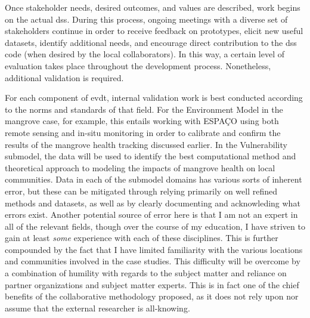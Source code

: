 \documentclass[notitlepage]{article}
\begin{document}
\color{black}


Once stakeholder needs, desired outcomes, and values are described, work begins on the actual \ac{dss}. During this process, ongoing meetings with a diverse set of stakeholders continue in order to receive feedback on prototypes, elicit new useful datasets, identify additional needs, and encourage direct contribution to the \ac{dss} code (when desired by the local collaborators). In this way, a certain level of evaluation takes place throughout the development process. Nonetheless, additional validation is required.

For each component of \ac{evdt}, internal validation work is best conducted according to the norms and standards of that field. For the Environment Model in the mangrove case, for example, this entails working with ESPAÇO using both remote sensing and in-situ monitoring in order to calibrate and confirm the results of the mangrove health tracking discussed earlier. In the Vulnerability submodel, the data will be used to identify the best computational method and theoretical approach to modeling the impacts of mangrove health on local communities. Data in each of the submodel domains has various sorts of inherent error, but these can be mitigated through relying primarily on well refined methods and datasets, as well as by clearly documenting and acknowleding what errors exist. Another potential source of error here is that I am not an expert in all of the relevant fields, though over the course of my education, I have striven to gain at least \textit{some} experience with each of these disciplines. This is further compounded by the fact that I have limited familiarity with the various locations and communities involved in the case studies. This difficulty will be overcome by a combination of humility with regards to the subject matter and reliance on partner organizations and subject matter experts. This is in fact one of the chief benefits of the collaborative methodology proposed, as it does not rely upon nor assume that the external researcher is all-knowing.
\end{document}
